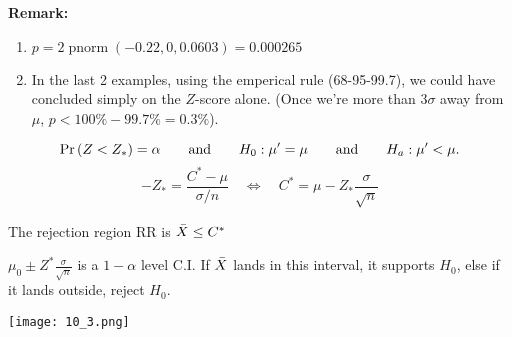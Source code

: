 \nl \textbf{Remark:}
\begin{enumerate}[label=\textcircled{\raisebox{-1pt}{\arabic*}}]
    \item $p = 2\operatorname{pnorm}(-0.22, 0, 0.0603) = 0.000265$
    \item In the last 2 examples, using the emperical rule (68-95-99.7), we could have concluded  simply on the $Z$-score alone. (Once we're more than $3\sigma$ away from $\mu$, $p < 100\%-99.7\% = 0.3\%$).
    \end{enumerate}

    $$\P{Z < Z_*} = \alpha \wideand
    H_0 : \mu' = \mu \wideand
    H_a : \mu' < \mu.$$
    $$-Z_* = \frac{C^*-\mu}{\sigma / n} \quad \iff \quad C^* = \mu - Z_* \frac{\sigma}{\sqrt{n}}$$

    \nl The rejection region RR is $\bar{X} \leq C^*$

    \nl $\displaystyle \mu_0 \pm Z^* \frac{\sigma}{\sqrt{n}}$ is a $1-\alpha$ level C.I. If $\bar{X}$ lands in this interval, it supports $H_0$, else if it lands outside, reject $H_0$.

    \noindent \begin{center}\texttt{[image: 10\_3.png]}\end{center}